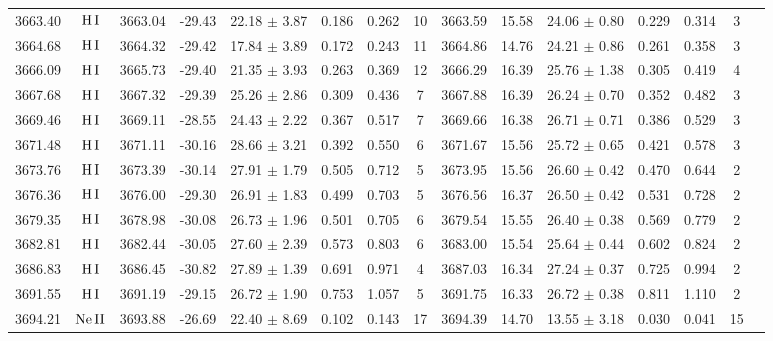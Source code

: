 \documentclass{article}
\begin{document}
\begin{table*}
\begin{adjustbox}{width=\textwidth}
\begin{tabular}{ccccccccccccccc}
3663.40 & $\mbox{H}\thinspace \mbox{I}$ & 3663.04 & -29.43 & 22.18 $\pm$ 3.87 & 0.186 & 0.262 & 10 & 3663.59 & 15.58 & 24.06 $\pm$ 0.80 & 0.229 & 0.314 & 3 &  \\
3664.68 & $\mbox{H}\thinspace \mbox{I}$ & 3664.32 & -29.42 & 17.84 $\pm$ 3.89 & 0.172 & 0.243 & 11 & 3664.86 & 14.76 & 24.21 $\pm$ 0.86 & 0.261 & 0.358 & 3 &  \\
3666.09 & $\mbox{H}\thinspace \mbox{I}$ & 3665.73 & -29.40 & 21.35 $\pm$ 3.93 & 0.263 & 0.369 & 12 & 3666.29 & 16.39 & 25.76 $\pm$ 1.38 & 0.305 & 0.419 & 4 &  \\
3667.68 & $\mbox{H}\thinspace \mbox{I}$ & 3667.32 & -29.39 & 25.26 $\pm$ 2.86 & 0.309 & 0.436 & 7 & 3667.88 & 16.39 & 26.24 $\pm$ 0.70 & 0.352 & 0.482 & 3 &  \\
3669.46 & $\mbox{H}\thinspace \mbox{I}$ & 3669.11 & -28.55 & 24.43 $\pm$ 2.22 & 0.367 & 0.517 & 7 & 3669.66 & 16.38 & 26.71 $\pm$ 0.71 & 0.386 & 0.529 & 3 &  \\
3671.48 & $\mbox{H}\thinspace \mbox{I}$ & 3671.11 & -30.16 & 28.66 $\pm$ 3.21 & 0.392 & 0.550 & 6 & 3671.67 & 15.56 & 25.72 $\pm$ 0.65 & 0.421 & 0.578 & 3 &  \\
3673.76 & $\mbox{H}\thinspace \mbox{I}$ & 3673.39 & -30.14 & 27.91 $\pm$ 1.79 & 0.505 & 0.712 & 5 & 3673.95 & 15.56 & 26.60 $\pm$ 0.42 & 0.470 & 0.644 & 2 &  \\
3676.36 & $\mbox{H}\thinspace \mbox{I}$ & 3676.00 & -29.30 & 26.91 $\pm$ 1.83 & 0.499 & 0.703 & 5 & 3676.56 & 16.37 & 26.50 $\pm$ 0.42 & 0.531 & 0.728 & 2 &  \\
3679.35 & $\mbox{H}\thinspace \mbox{I}$ & 3678.98 & -30.08 & 26.73 $\pm$ 1.96 & 0.501 & 0.705 & 6 & 3679.54 & 15.55 & 26.40 $\pm$ 0.38 & 0.569 & 0.779 & 2 &  \\
3682.81 & $\mbox{H}\thinspace \mbox{I}$ & 3682.44 & -30.05 & 27.60 $\pm$ 2.39 & 0.573 & 0.803 & 6 & 3683.00 & 15.54 & 25.64 $\pm$ 0.44 & 0.602 & 0.824 & 2 &  \\
3686.83 & $\mbox{H}\thinspace \mbox{I}$ & 3686.45 & -30.82 & 27.89 $\pm$ 1.39 & 0.691 & 0.971 & 4 & 3687.03 & 16.34 & 27.24 $\pm$ 0.37 & 0.725 & 0.994 & 2 &  \\
3691.55 & $\mbox{H}\thinspace \mbox{I}$ & 3691.19 & -29.15 & 26.72 $\pm$ 1.90 & 0.753 & 1.057 & 5 & 3691.75 & 16.33 & 26.72 $\pm$ 0.38 & 0.811 & 1.110 & 2 &  \\
3694.21 & $\mbox{Ne}\thinspace \mbox{II}$ & 3693.88 & -26.69 & 22.40 $\pm$ 8.69 & 0.102 & 0.143 & 17 & 3694.39 & 14.70 & 13.55 $\pm$ 3.18 & 0.030 & 0.041 & 15 &  \\

\end{tabular}
\end{adjustbox}
\end{table*}
\end{document}
